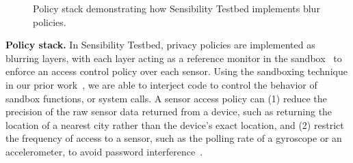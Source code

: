\begin{figure}
\caption{\small Policy stack demonstrating how Sensibility Testbed implements blur policies.
\label{fig-blur}}
\end{figure}

\textbf{Policy stack.}
In Sensibility Testbed, privacy policies are implemented as blurring layers, with each layer acting as a 
reference monitor in the sandbox~\cite{ref} to enforce an access 
control policy over each sensor. Using the sandboxing 
technique in our prior work~\cite{cappos2010retaining}, we are able to
interject code to control the behavior of sandbox functions, or 
system calls. A sensor access policy can (1) reduce 
the precision of the raw sensor data returned from a device, such
as returning the location of a nearest city rather than the device's exact location, and (2) restrict 
the frequency of access to a sensor, such as the polling rate of a gyroscope or
an accelerometer, to avoid password interference~\cite{michalevsky2014gyrophone}.



